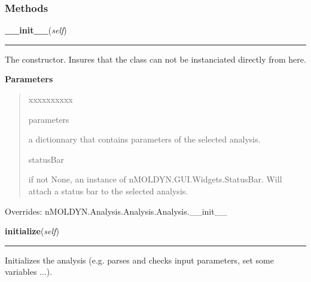   \subsubsection{Methods}

    \vspace{0.5ex}

\hspace{.8\funcindent}\begin{boxedminipage}{\funcwidth}

    \raggedright \textbf{\_\_init\_\_}(\textit{self})

    \vspace{-1.5ex}

    \rule{\textwidth}{0.5\fboxrule}
\setlength{\parskip}{2ex}
    The constructor. Insures that the class can not be instanciated 
    directly from here.

\setlength{\parskip}{1ex}
      \textbf{Parameters}
      \vspace{-1ex}

      \begin{quote}
        \begin{Ventry}{xxxxxxxxxx}

          \item[parameters]

          a dictionnary that contains parameters of the selected analysis.

          \item[statusBar]

          if not None, an instance of nMOLDYN.GUI.Widgets.StatusBar. Will 
          attach a status bar to the selected analysis.

        \end{Ventry}

      \end{quote}

      Overrides: nMOLDYN.Analysis.Analysis.Analysis.\_\_init\_\_

    \end{boxedminipage}

    \label{nMOLDYN:Analysis:NMR:OrderParameter:initialize}

    \vspace{0.5ex}

\hspace{.8\funcindent}\begin{boxedminipage}{\funcwidth}

    \raggedright \textbf{initialize}(\textit{self})

    \vspace{-1.5ex}

    \rule{\textwidth}{0.5\fboxrule}
\setlength{\parskip}{2ex}
    Initializes the analysis (e.g. parses and checks input parameters, set 
    some variables ...).

\setlength{\parskip}{1ex}
    \end{boxedminipage}

